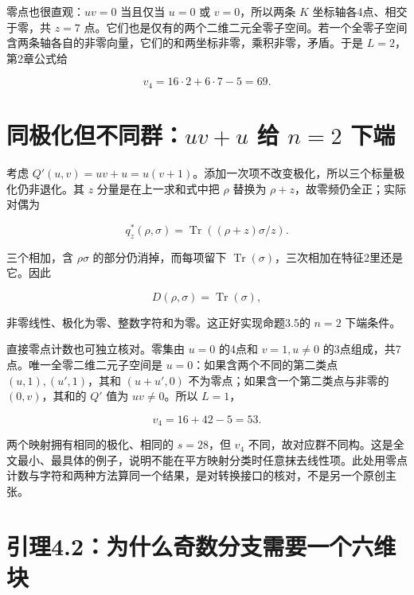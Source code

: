 \documentclass[UTF8,fontset=fandol,zihao=-4,openany,oneside]{ctexbook}
\begin{document}
零点也很直观：\(uv=0\) 当且仅当 \(u=0\) 或 \(v=0\)，所以两条 \(K\) 坐标轴各4点、相交于零，共 \(z=7\) 点。它们也是仅有的两个二维二元全零子空间。若一个全零子空间含两条轴各自的非零向量，它们的和两坐标非零，乘积非零，矛盾。于是 \(L=2\)，第2章公式给



\[
v_4=16\cdot2+6\cdot7-5=69.
\]



\section{同极化但不同群：\texorpdfstring{\(uv+u\)}{uv+u} 给 \texorpdfstring{\(n=2\)}{n=2} 下端}


考虑 \(Q'(u,v)=uv+u=u(v+1)\)。添加一次项不改变极化，所以三个标量极化仍非退化。其 \(z\) 分量是在上一求和式中把 \(\rho\) 替换为 \(\rho+z\)，故零频仍全正；实际对偶为



\[
q_z^*(\rho,\sigma)=\operatorname{Tr}((\rho+z)\sigma/z).
\]



三个相加，含 \(\rho\sigma\) 的部分仍消掉，而每项留下 \(\operatorname{Tr}(\sigma)\)，三次相加在特征2里还是它。因此



\[
D(\rho,\sigma)=\operatorname{Tr}(\sigma),
\]



非零线性、极化为零、整数字符和为零。这正好实现命题3.5的 \(n=2\) 下端条件。



直接零点计数也可独立核对。零集由 \(u=0\) 的4点和 \(v=1,u\ne0\) 的3点组成，共7点。唯一全零二维二元子空间是 \(u=0\)：如果含两个不同的第二类点 \((u,1),(u',1)\)，其和 \((u+u',0)\) 不为零点；如果含一个第二类点与非零的 \((0,v)\)，其和的 \(Q'\) 值为 \(uv\ne0\)。所以 \(L=1\)，



\[
v_4=16+42-5=53.
\]



两个映射拥有相同的极化、相同的 \(s=28\)，但 \(v_4\) 不同，故对应群不同构。这是全文最小、最具体的例子，说明不能在平方映射分类时任意抹去线性项。此处用零点计数与字符和两种方法算同一个结果，是对转换接口的核对，不是另一个原创主张。



\section{引理4.2：为什么奇数分支需要一个六维块}
\end{document}
